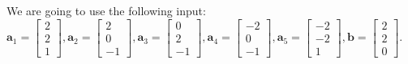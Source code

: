 \documentclass[preview]{standalone}
\renewcommand{\vec}{\mathbf}
\begin{document}
\begin{center}
We are going to use the following input:\\$\vec{a}_1=\begin{bmatrix}2\\2\\1\end{bmatrix},\vec{a}_2=\begin{bmatrix}2\\0\\-1\end{bmatrix},\vec{a}_3=\begin{bmatrix}0\\2\\-1\end{bmatrix},\vec{a}_4=\begin{bmatrix}-2\\0\\-1\end{bmatrix},\vec{a}_5=\begin{bmatrix}-2\\-2\\1\end{bmatrix},\vec{b}=\begin{bmatrix}2\\2\\0\end{bmatrix}.$
\end{center}
\end{document}
